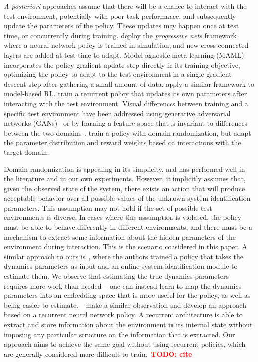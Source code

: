 \documentclass{article}
\newcommand{\TODO}[1]{\textcolor{red}{\textbf{TODO: #1}}}
\begin{document}
\emph{A posteriori} approaches assume that there will be a chance to interact with the test environment,
potentially with poor task performance,
and subsequently update the parameters of the policy.
These updates may happen once at test time, or concurrently during training.
%
\citet{rusu-progressive-nets} deploy the \emph{progressive nets} framework
where a neural network policy is trained in simulation, and new cross-connected layers are added
at test time to adapt.
%
Model-agnostic meta-learning (MAML)~\citep{finn-maml-icml17} incorporates the policy gradient update step directly in its training objective,
optimizing the policy to adapt to the test environment in a single gradient descent step after gathering a small amount of data.
\citet{clavera-maml-model} apply a similar framework to model-based RL.
%
\citet{duan-rl2} train a recurrent policy that updates its own parameters after interacting with the test environment.
%
Visual differences between training and a specific test environment have been addressed
using generative adversarial networks (GANs)~\citep{bousmalis-domain-gan-cvpr17}
or by learning a feature space that is invariant to differences between the two domains~\citep{bousmalis-domainseparation-nips16}.
%
%
\citet{rajeswaran-epopt-corr16} train a policy with domain randomization, but
adapt the parameter distribution and reward weights based on interactions with the target domain.

Domain randomization is appealing in its simplicity, and has performed well in the literature and in our own experiments.
However, it implicitly assumes that, given the observed state of the system,
there exists an action that will produce acceptable behavior over all possible values
of the unknown system identification parameters.
This assumption may not hold if the set of possible test environments is diverse.
%
In cases where this assumption is violated, the policy must be able to behave differently in different environments,
and there must be a mechanism to extract some information about the hidden parameters of the environment during interaction.
This is the scenario considered in this paper.
A similar approach to ours is~\citet{yu-up-osi-rss17},
where the authors trained a policy that takes the dynamics parameters as input
and an online system identification module to estimate them.
We observe that estimating the true dynamics parameters requires more work than needed --
one can instead learn to map the dynamics parameters into an embedding space
that is more useful for the policy, as well as being easier to estimate.
~\citet{peng-dynamics-randomization-corr17} make a similar observation and develop an approach based on a recurrent neural network policy.
A recurrent architecture is able to extract and store information about the environment in its internal state without imposing any particular structure on the information that is extracted.
Our approach aims to achieve the same goal without using recurrent policies, which are generally considered more difficult to train.~\TODO{cite}
\end{document}
